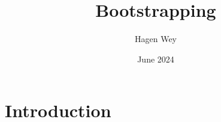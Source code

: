 \documentclass[11pt]{article}
\title{Bootstrapping}
\author{Hagen Wey}
\date{June 2024}
\begin{document}
    
\maketitle

\section{Introduction}
\end{document}
